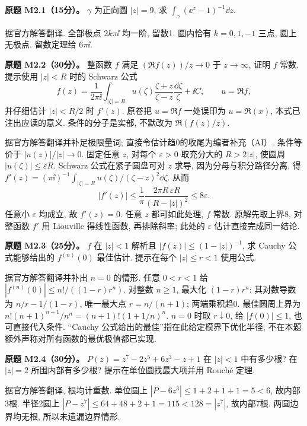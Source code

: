\begin{exercise}\label{ass:m2-1}
\textbf{原题 M2.1（15分）。} $\gamma$ 为正向圆 $|z|=9$, 求 $\int_\gamma(\ee^z-1)^{-1}\dd z$.
\end{exercise}
\begin{solution}据官方解答翻译. 全部极点 $2k\pi\ii$ 均一阶, 留数1. 圆内恰有 $k=0,1,-1$ 三点, 圆上无极点. 留数定理给 $6\pi\ii$.\end{solution}
\begin{exercise}\label{ass:m2-2}
\textbf{原题 M2.2（30分）。} 整函数 $f$ 满足 $(\Re f(z))/z\to0$ 于 $z\to\infty$, 证明 $f$ 常数. 提示使用 $|z|<R$ 时的 Schwarz 公式
\[
f(z)=\frac1{2\pi\ii}\int_{|\zeta|=R}u(\zeta)\frac{\zeta+z}{\zeta-z}\frac{\dd\zeta}{\zeta}+\ii C,\qquad u=\Re f,
\]
并仔细估计 $|z|<R/2$ 时 $f'(z)$. 原卷把 $u=\Re f$ 一处误印为 $u=\Re(x)$, 本式已注出应读的意义. 条件的分子是实部, 不默改为 $\Re(f(z)/z)$.
\end{exercise}
\begin{solution}
据官方解答翻译并补足极限量词; 直接令估计趋0的收尾为编者补充（AI）. 条件等价于 $|u(z)|/|z|\to0$. 固定任意 $z$, 对每个 $\varepsilon>0$ 取充分大的 $R>2|z|$, 使圆周 $|u(\zeta)|\le\varepsilon R$. Schwarz 公式在紧子圆盘可对 $z$ 求导, 因为分母与积分路径分离, 得 $f'(z)=(\pi\ii)^{-1}\int_{|\zeta|=R}u(\zeta)/(\zeta-z)^2\dd\zeta$. 从而
\[
|f'(z)|\le\frac1\pi\frac{2\pi R\,\varepsilon R}{(R-|z|)^2}\le8\varepsilon.
\]
任意小 $\varepsilon$ 均成立, 故 $f'(z)=0$. 任意 $z$ 都可如此处理, $f$ 常数. 原解先取上界8, 对整函数 $f'$ 用 Liouville 得线性函数, 再排除斜率; 此处的 $\varepsilon$ 估计直接完成同一结论.
\end{solution}
\begin{exercise}\label{ass:m2-3}
\textbf{原题 M2.3（25分）。} $f$ 在 $|z|<1$ 解析且 $|f(z)|\le(1-|z|)^{-1}$, 求 Cauchy 公式能够给出的 $f^{(n)}(0)$ 最佳估计. 提示在每个 $|z|\le r<1$ 使用公式.
\end{exercise}
\begin{solution}
据官方解答翻译并补出 $n=0$ 的情形. 任意 $0<r<1$ 给 $|f^{(n)}(0)|\le n!/((1-r)r^n)$. 对整数 $n\ge1$, 最大化 $(1-r)r^n$: 其对数导数为 $n/r-1/(1-r)$, 唯一最大点 $r=n/(n+1)$; 两端乘积趋0. 最佳圆周上界为 $n!(n+1)^{n+1}/n^n=(n+1)!(1+1/n)^n$. $n=0$ 时取 $r\downarrow0$, 给 $|f(0)|\le1$, 也可直接代入条件. “Cauchy 公式给出的最佳”指在此给定模界下优化半径, 不在本题额外声称对所有函数的最优极值都已实现.
\end{solution}
\begin{exercise}\label{ass:m2-4}
\textbf{原题 M2.4（30分）。} $P(z)=z^7-2z^5+6z^3-z+1$ 在 $|z|<1$ 中有多少根? 在 $|z|=2$ 所围内部有多少根? 提示在单位圆找最大项并用 Rouché 定理.
\end{exercise}
\begin{solution}据官方解答翻译, 根均计重数. 单位圆上 $|P-6z^3|\le1+2+1+1=5<6$, 故内部3根. 半径2圆上 $|P-z^7|\le64+48+2+1=115<128=|z^7|$, 故内部7根. 两圆边界均无根, 所以未遗漏边界情形.\end{solution}
